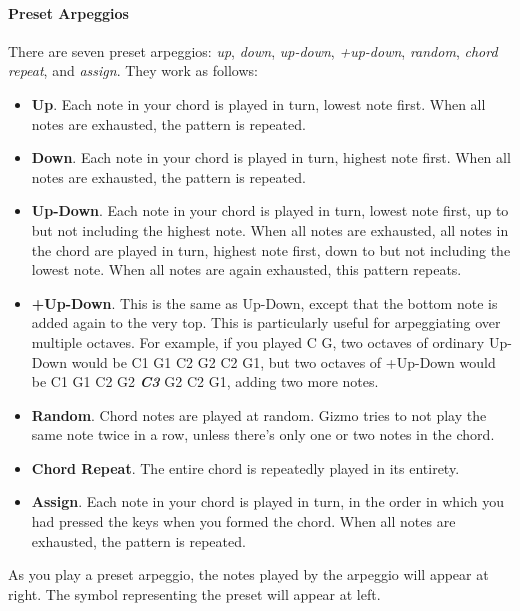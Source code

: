 \documentclass{article}
\begin{document}
\paragraph{Preset Arpeggios}

There are seven preset arpeggios: {\it up}, {\it down}, {\it up-down}, {\it  +up-down}, {\it random}, {\it chord repeat}, and {\it assign}.  They work as follows:

\begin{itemize}
\item {\bf Up}.  Each note in your chord is played in turn, lowest note first.  When all notes are exhausted, the pattern is repeated.
\end{itemize}

\begin{itemize}
\item {\bf Down}.  Each note in your chord is played in turn, highest note first.  When all notes are exhausted, the pattern is repeated.
\item {\bf Up-Down}.  Each note in your chord is played in turn, lowest note first, up to but not including the highest note.  When all notes are exhausted, all notes in the chord are played in turn, highest note first, down to but not including the lowest note.  When all notes are again exhausted, this pattern repeats.
\item {\bf  +Up-Down}.  This is the same as Up-Down, except that the bottom note is added again to the very top.  This is particularly useful for arpeggiating over multiple octaves.  For example, if you played C G, two octaves of ordinary Up-Down would be C1 G1 C2 G2 C2 G1, but two octaves of +Up-Down would be C1 G1 C2 G2 \textit{\textbf{C3}} G2 C2 G1, adding two more notes.  
\item {\bf Random}.  Chord notes are played at random.  Gizmo tries to not play the same note twice in a row, unless there's only one or two notes in the chord.
\item {\bf Chord Repeat}.  The entire chord is repeatedly played in its entirety.
\item {\bf Assign}. Each note in your chord is played in turn, in the order in which you had pressed the keys when you formed the chord.  When all notes are exhausted, the pattern is repeated.
\end{itemize}

As you play a preset arpeggio, the notes played by the arpeggio will appear at right.  The symbol representing the preset will appear at left.
\end{document}
